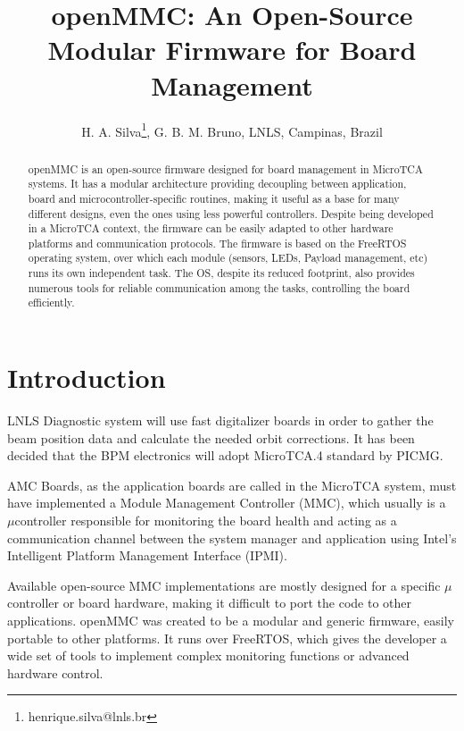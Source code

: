 \documentclass[a4paper,
              ]{jacow}
\begin{document}
\title{openMMC: An Open-Source Modular Firmware for Board Management}

\author{H. A. Silva\thanks{henrique.silva@lnls.br}, G. B. M. Bruno, LNLS, Campinas, Brazil}

\maketitle

%
\begin{abstract}
  openMMC is an open-source firmware designed for board management in MicroTCA systems.
  It has a modular architecture providing decoupling between application,
  board and microcontroller-specific routines, making it useful as a base for many
  different designs, even the ones using less powerful controllers.
  Despite being developed in a MicroTCA context, the firmware can be easily adapted
  to other hardware platforms and communication protocols.
  The firmware is based on the FreeRTOS operating system, over which each module
  (sensors, LEDs, Payload management, etc) runs its own independent task.
  The OS, despite its reduced footprint, also provides numerous tools for reliable
  communication among the tasks, controlling the board efficiently.
\end{abstract}

\section{Introduction}
LNLS Diagnostic system will use fast digitalizer boards in order to gather the beam position data and calculate the needed orbit corrections. It has been decided that the BPM electronics will adopt MicroTCA.4 standard by PICMG.

AMC Boards, as the application boards are called in the MicroTCA system, must have implemented a Module Management Controller (MMC), which usually is a $\mu$controller responsible for monitoring the board health and acting as a communication channel between the system manager and application using Intel's Intelligent Platform Management Interface (IPMI).

Available open-source MMC implementations are mostly designed for a specific $\mu$controller or board hardware, making it difficult to port the code to other applications. openMMC was created to be a modular and generic firmware, easily portable to other platforms. It runs over FreeRTOS, which gives the developer a wide set of tools to implement complex monitoring functions or advanced hardware control.
\end{document}
